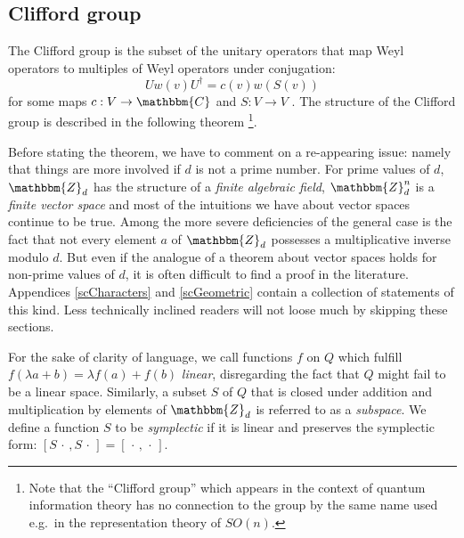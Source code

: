 \documentclass[aps,twocolumn,floatfix]{revtex4}
\def\ZZ{\mathbbm{Z}}
\def\CC{\mathbbm{C}}
\def\spacedot{\,\cdot\,}
\begin{document}
\subsection{Clifford group}

The Clifford group is the subset of the unitary operators that map
Weyl operators to multiples of Weyl operators under conjugation:
\begin{equation}\label{cliffordDefinition}
	U w(v) U^\dagger = c(v) w(S(v))
\end{equation}
for some maps $c: V \to \CC$ and $S: V \to V$
\cite{gottesman}. 
The structure of the Clifford group 
is described in the following
theorem
\footnote{
	Note that the ``Clifford group'' which appears in the context of
	quantum information theory \cite{gottesman} has no connection to the
	group by the same name used	e.g.\ in the representation theory of
	$SO(n)$.
}.

Before stating the theorem, we have to comment on a re-appearing
issue: namely that things are more involved if $d$ is not a prime
number. For prime values of $d$, $\ZZ_d$ has the structure of a
\emph{finite algebraic field}, $\ZZ_d^n$ is a \emph{finite vector
space} and most of the intuitions we have about vector spaces continue
to be true.  Among the more severe deficiencies of the general case is
the fact that not every element $a$ of $\ZZ_d$ possesses a
multiplicative inverse modulo $d$. But even if the analogue of a
theorem about vector spaces holds for non-prime values of $d$, it is
often difficult to find a proof in the literature.  Appendices
\ref{scCharacters} and \ref{scGeometric} contain a collection of
statements of this kind.
Less technically inclined readers will not loose much by skipping
these sections.

For the sake of clarity of language, we call functions $f$ on $Q$ which
fulfill $f(\lambda a +b)=\lambda f(a) + f(b)$ \emph{linear},
disregarding the fact that $Q$ might fail to be a linear space.
Similarly, a subset $S$ of $Q$ that is closed under addition and
multiplication by elements of $\ZZ_d$ is referred to as a
\emph{subspace}.  
We define a function $S$ to be
\emph{symplectic} if it is linear and preserves the symplectic form:
$[S\spacedot,S\spacedot]=[\spacedot,\spacedot]$.
\end{document}
